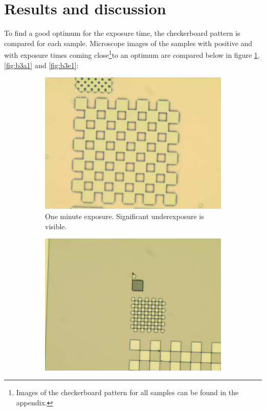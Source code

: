 \section*{Results and discussion}
To find a good optimum for the exposure time, the checkerboard pattern is compared for each sample. Microscope images of the samples with positive  and with exposure times coming close\footnote{Images of the checkerboard pattern for all samples can be found in the appendix.}to an optimum are compared below in figure \ref{fig:b3d1},\ref{fig:b3a1} and \ref{fig:b3e1}:

\begin{figure}[ht]
    \centering
    \begin{subfigure}[t]{0.3\linewidth}
        \centering
        \includegraphics[width=\textwidth]{data/b3d1.jpg}
        \caption{One minute exposure. Significant underexposure is visible.}
        \label{fig:b3d1}
    \end{subfigure}
    \hfill
    \begin{subfigure}[t]{0.3\linewidth}
        \centering
        \includegraphics[width=\textwidth]{data/b3a1.jpg}

\end{subfigure}
\end{figure}
